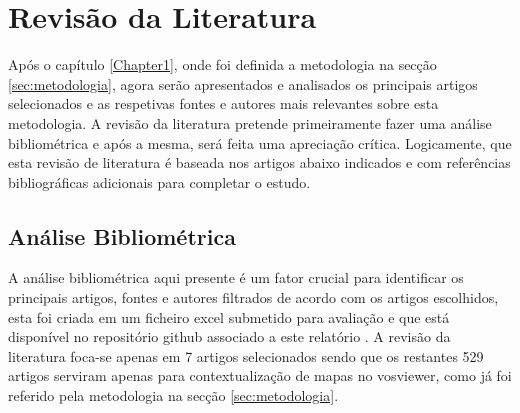 
\chapter{Revisão da Literatura}	%
\label{Chapter2}

Após o capítulo \ref{Chapter1}, onde foi definida a metodologia na secção \ref{sec:metodologia}, agora serão apresentados  e analisados os principais artigos selecionados e as respetivas fontes e autores mais relevantes sobre esta metodologia.
A revisão da literatura pretende primeiramente fazer uma análise bibliométrica e após a mesma,  será feita uma apreciação crítica. Logicamente, que esta revisão de literatura é baseada nos artigos  abaixo indicados e com referências bibliográficas adicionais para completar o estudo.


\section{Análise Bibliométrica}
\label{sec:analise_bibliometrica}

A análise bibliométrica aqui presente é um fator crucial para identificar os principais artigos, fontes e autores filtrados de acordo com os artigos escolhidos, esta foi criada em um ficheiro \gls{excel} submetido para avaliação e que está disponível no repositório \gls{github} associado a este relatório \cite{JunqueiraDevEduardoRepositório}.
A revisão da literatura foca-se apenas em 7 artigos selecionados sendo que os restantes 529 artigos serviram apenas para contextualização de mapas no \gls{vosviewer}, como já foi referido pela metodologia na secção \ref{sec:metodologia}.

